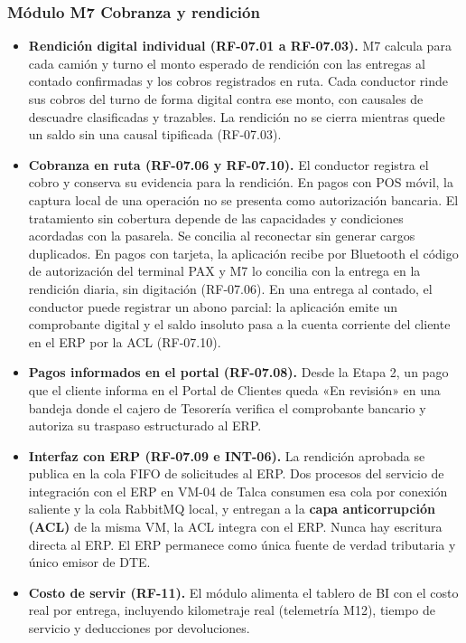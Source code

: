 \subsubsection*{Módulo M7 Cobranza y rendición}
\begin{itemize}
  \item \textbf{Rendición digital individual (RF-07.01 a RF-07.03).} M7 calcula para cada camión y turno el monto esperado de rendición con las entregas al contado confirmadas y los cobros registrados en ruta. Cada conductor rinde sus cobros del turno de forma digital contra ese monto, con causales de descuadre clasificadas y trazables. La rendición no se cierra mientras quede un saldo sin una causal tipificada (RF-07.03).
  \item \textbf{Cobranza en ruta (RF-07.06 y RF-07.10).} El conductor registra el cobro y conserva su evidencia para la rendición. En pagos con POS móvil, la captura local de una operación no se presenta como autorización bancaria. El tratamiento sin cobertura depende de las capacidades y condiciones acordadas con la pasarela. Se concilia al reconectar sin generar cargos duplicados. En pagos con tarjeta, la aplicación recibe por Bluetooth el código de autorización del terminal PAX y M7 lo concilia con la entrega en la rendición diaria, sin digitación (RF-07.06). En una entrega al contado, el conductor puede registrar un abono parcial: la aplicación emite un comprobante digital y el saldo insoluto pasa a la cuenta corriente del cliente en el ERP por la ACL (RF-07.10).
  \item \textbf{Pagos informados en el portal (RF-07.08).} Desde la Etapa 2, un pago que el cliente informa en el Portal de Clientes queda «En revisión» en una bandeja donde el cajero de Tesorería verifica el comprobante bancario y autoriza su traspaso estructurado al ERP.
  \item \textbf{Interfaz con ERP (RF-07.09 e INT-06).} La rendición aprobada se publica en la cola FIFO de solicitudes al ERP. Dos procesos del servicio de integración con el ERP en VM-04 de Talca consumen esa cola por conexión saliente y la cola RabbitMQ local, y entregan a la \textbf{capa anticorrupción (ACL)} de la misma VM, la ACL integra con el ERP. Nunca hay escritura directa al ERP. El ERP permanece como única fuente de verdad tributaria y único emisor de DTE.
  \item \textbf{Costo de servir (RF-11).} El módulo alimenta el tablero de BI con el costo real por entrega, incluyendo kilometraje real (telemetría M12), tiempo de servicio y deducciones por devoluciones.
\end{itemize}
\label{fuente-05-anexo-4-1-d-matriz-de-los-doce-modulos-fin}

